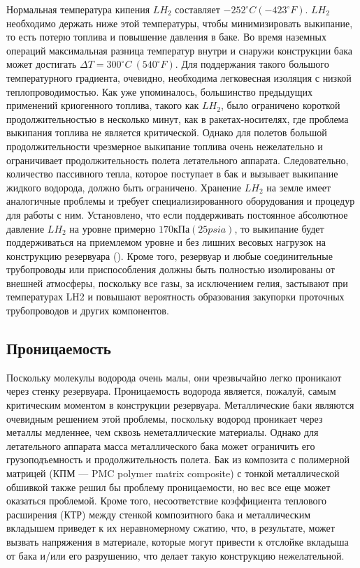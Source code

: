Нормальная температура кипения \(LH_2\) составляет \(-252^{\circ}C (-423^{\circ}F)\). \(LH_2\) необходимо держать ниже этой температуры, чтобы минимизировать выкипание, то есть потерю топлива и повышение давления в баке. Во время наземных операций максимальная разница температур внутри и снаружи конструкции бака может достигать \(\Delta T = 300^{\circ}C~(540^{\circ}F)\). Для поддержания такого большого температурного градиента, очевидно, необходима легковесная изоляция с низкой теплопроводимостью. Как уже упоминалось, большинство предыдущих применений криогенного топлива, такого как \(LH_2\), было ограничено короткой продолжительностью в несколько минут, как в ракетах-носителях, где проблема выкипания топлива не является критической. Однако для полетов большой продолжительности чрезмерное выкипание топлива очень нежелательно и ограничивает продолжительность полета летательного аппарата. Следовательно, количество пассивного тепла, которое поступает в бак и вызывает выкипание жидкого водорода, должно быть ограничено. Хранение \(LH_2\) на земле имеет аналогичные проблемы и требует специализированного оборудования и процедур для работы с ним. Установлено, что если поддерживать постоянное абсолютное давление \(LH_2\) на уровне примерно \(170 кПа (25 psia)\), то выкипание будет поддерживаться на приемлемом уровне и без лишних весовых нагрузок на конструкцию резервуара (\cite{brewer1991}). Кроме того, резервуар и любые соединительные трубопроводы или приспособления должны быть полностью изолированы от внешней атмосферы, поскольку все газы, за исключением гелия, застывают при температурах LH2 и повышают вероятность образования закупорки проточных трубопроводов и других компонентов.

\subsection{Проницаемость}\label{ch:overview:1:sec2:sub3}

Поскольку молекулы водорода очень малы, они чрезвычайно легко проникают через стенку резервуара. Проницаемость водорода является, пожалуй, самым критическим моментом в конструкции резервуара. Металлические баки являются очевидным решением этой проблемы, поскольку водород проникает через металлы медленнее, чем сквозь неметаллические материалы. Однако для летательного аппарата масса металлического бака может ограничить его грузоподъемность и продолжительность полета. Бак из композита с полимерной матрицей (КПМ --- PMC polymer matrix composite) с тонкой металлической обшивкой также решил бы проблему проницаемости, но вес все еще может оказаться проблемой. Кроме того, несоответствие коэффициента теплового расширения (КТР) между стенкой композитного бака и металлическим вкладышем приведет к их неравномерному сжатию, что, в результате, может вызвать напряжения в материале, которые могут привести к отслойке вкладыша от бака и/или его разрушению, что делает такую конструкцию нежелательной. 

